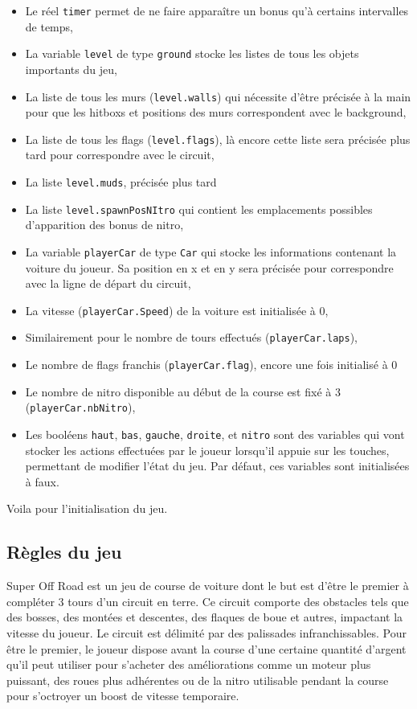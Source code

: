 \documentclass[11pt, final]{report}
\renewcommand{\tt}[1]{\texttt{#1}}
\begin{document}
\begin{itemize}
\item
Le réel \tt{timer} permet de ne faire apparaître un bonus qu'à certains intervalles de temps,
\item
La variable \tt{level} de type \tt{ground} stocke les listes de tous les objets importants du jeu,
\item
La liste de tous les murs (\tt{level.walls}) qui nécessite d'être précisée à la main pour que les hitboxs et positions des murs correspondent avec le background,
\item
La liste de tous les flags (\tt{level.flags}), là encore cette liste sera précisée plus tard pour correspondre avec le circuit, 
 \item
La liste \tt{level.muds}, précisée plus tard
 \item
La liste \tt{level.spawnPosNItro} qui contient les emplacements possibles d'apparition des bonus de nitro,
\item
La variable \tt{playerCar} de type \tt{Car} qui stocke les informations contenant la voiture du joueur. Sa position en x et en y sera précisée pour correspondre avec la ligne de départ du circuit, 
\item
La vitesse (\tt{playerCar.Speed}) de la voiture est initialisée à 0, 
\item
Similairement pour le nombre de tours effectués (\tt{playerCar.laps}),
\item
Le nombre de flags franchis (\tt{playerCar.flag}), encore une fois initialisé à 0
\item
Le nombre de nitro disponible au début de la course est fixé à 3 (\tt{playerCar.nbNitro}),
\item
Les booléens \tt{haut}, \tt{bas}, \tt{gauche}, \tt{droite}, et \tt{nitro} sont des variables qui vont stocker les actions effectuées par le joueur lorsqu'il appuie sur les touches, permettant de modifier l'état du jeu. Par défaut, ces variables sont initialisées à faux.
\end{itemize}

Voila pour l'initialisation du jeu.

\subsection{Règles du jeu}

Super Off Road est un jeu de course de voiture dont le but est d'être le premier à compléter 3 tours d'un circuit en terre. Ce circuit comporte des obstacles tels que des bosses, des montées et descentes, des flaques de boue et autres, impactant la vitesse du joueur. Le circuit est délimité par des palissades infranchissables. Pour être le premier, le joueur dispose avant la course d'une certaine quantité d'argent qu'il peut utiliser pour s'acheter des améliorations comme un moteur plus puissant, des roues plus adhérentes ou de la nitro utilisable pendant la course pour s'octroyer un boost de vitesse temporaire.
\\
\end{document}
